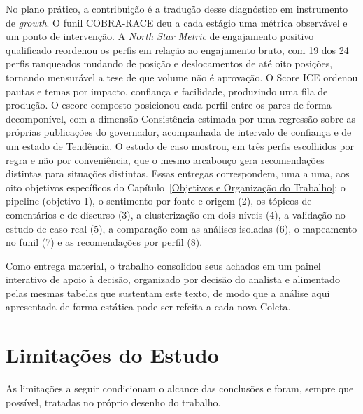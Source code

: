 No plano prático, a contribuição é a tradução desse diagnóstico em instrumento de \emph{growth}. O funil COBRA-RACE deu a cada estágio uma métrica observável e um ponto de intervenção. A \emph{North Star Metric} de engajamento positivo qualificado reordenou os perfis em relação ao engajamento bruto, com 19 dos 24 perfis ranqueados mudando de posição e deslocamentos de até oito posições,
tornando mensurável a tese de que volume não é aprovação. O Score ICE ordenou pautas e temas por impacto, confiança e facilidade, produzindo uma fila de produção. O escore composto posicionou cada perfil entre os pares de forma decomponível, com a dimensão Consistência estimada por uma regressão sobre as próprias publicações do governador, acompanhada de intervalo de confiança e de um estado de Tendência. O estudo de caso mostrou, em três perfis escolhidos por regra e não por conveniência, que o mesmo arcabouço gera recomendações distintas para situações distintas. Essas entregas correspondem, uma a uma, aos oito objetivos específicos do Capítulo~\ref{Objetivos e Organização do Trabalho}: o pipeline (objetivo 1), o sentimento por fonte e origem (2), os tópicos de comentários e de discurso (3), a clusterização em dois níveis (4), a validação no estudo de caso real (5), a comparação com as análises isoladas (6), o mapeamento no funil (7) e as recomendações por perfil (8).

Como entrega material, o trabalho consolidou seus achados em um painel interativo de apoio à decisão, organizado por decisão do analista e alimentado pelas mesmas tabelas que sustentam este texto, de modo que a análise aqui apresentada de forma estática pode ser refeita a cada nova Coleta.

\section{Limitações do Estudo}

As limitações a seguir condicionam o alcance das conclusões e foram, sempre que possível, tratadas no próprio desenho do trabalho.

